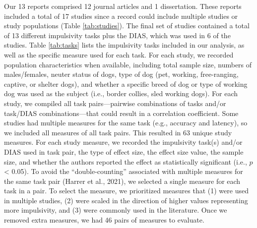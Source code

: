 \documentclass[
  ,pub,floatsintext]{apa6}
\begin{document}
Our 13 reports comprised 12 journal articles and 1 dissertation. These reports included a total of 17 studies since a record could include multiple studies or study populations (Table \ref{tab:studies}). The final set of studies contained a total of 13 different impulsivity tasks plus the DIAS, which was used in 6 of the studies. Table \ref{tab:tasks} lists the impulsivity tasks included in our analysis, as well as the specific measure used for each task. For each study, we recorded population characteristics when available, including total sample size, numbers of males/females, neuter status of dogs, type of dog (pet, working, free-ranging, captive, or shelter dogs), and whether a specific breed of dog or type of working dog was used as the subject (i.e., border collies, sled working dogs). For each study, we compiled all task pairs---pairwise combinations of tasks and/or task/DIAS combinations---that could result in a correlation coefficient. Some studies had multiple measures for the same task (e.g., accuracy and latency), so we included all measures of all task pairs. This resulted in 63 unique study measures. For each study measure, we recorded the impulsivity task(s) and/or DIAS used in task pair, the type of effect size, the effect size value, the sample size, and whether the authors reported the effect as statistically significant (i.e., \(p\) \textless{} 0.05). To avoid the ``double-counting'' associated with multiple measures for the same task pair (Harrer et al., 2021), we selected a single measure for each task in a pair. To select the measure, we prioritized measures that (1) were used in multiple studies, (2) were scaled in the direction of higher values representing more impulsivity, and (3) were commonly used in the literature. Once we removed extra measures, we had 46 pairs of measures to evaluate.

\renewcommand{\arraystretch}{1.2}
\end{document}
